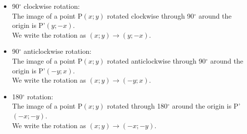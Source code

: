 \begin{minipage}{0.55\textwidth}
\begin{itemize}
\item 
90$^\circ$ clockwise rotation:\\
The image of a point P$(x;y)$ rotated clockwise through 90$^\circ$ around the origin is P'$(y; - x)$.\\
We write the rotation as $(x;y) \rightarrow (y; -x)$.
\vspace{3cm}
\item
90$^\circ$ anticlockwise rotation:\\
The image of a point P$(x;y)$ rotated anticlockwise through 90$^\circ$ around the origin is P'$(-y; x)$.\\
We write the rotation as $(x;y) \rightarrow (-y; x)$.
\vspace{3cm}
\item
180$^\circ$ rotation:\\
The image of a point P$(x;y)$ rotated through 180$^\circ$ around the origin is P'$(-x; -y)$.\\
We write the rotation as $(x;y) \rightarrow (-x; -y)$.
\end{itemize}
\end{minipage}
